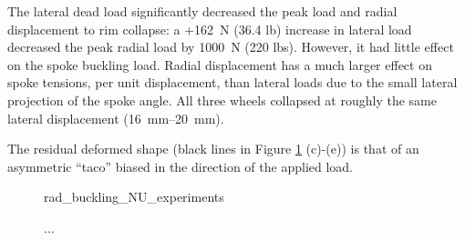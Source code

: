 \documentclass[\rootdir/thesis.tex]{subfiles}
\begin{document}
The lateral dead load significantly decreased the peak load and radial displacement to rim collapse: a +\SI{162}{N} (\num{36.4} lb) increase in lateral load decreased the peak radial load by \SI{1000}{N} (\num{220} lbs). However, it had little effect on the spoke buckling load. Radial displacement has a much larger effect on spoke tensions, per unit displacement, than lateral loads due to the small lateral projection of the spoke angle. All three wheels collapsed at roughly the same lateral displacement (\SIrange{16}{20}{mm}).

The residual deformed shape (black lines in Figure \ref{fig:rad_buckling_NU_experiments} (c)-(e)) is that of an asymmetric ``taco'' biased in the direction of the applied load. 

\begin{figure}[h]
\centering
{rad_buckling_NU_experiments}
\caption{...}
\label{fig:rad_buckling_NU_experiments}
\end{figure}
\end{document}
